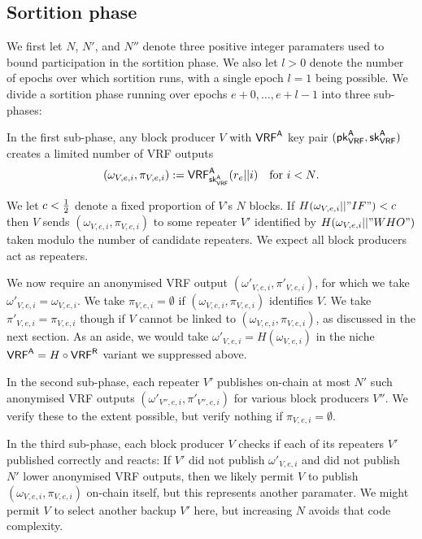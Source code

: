 \subsection{Sortition phase}\label{subsec:sortirion_phase}
\newcommand{\vrfaproductionbound}{N}
\newcommand{\vrfarepeatbound}{N'}
\newcommand{\vrfawinnerbound}{N''}

We first let $\vrfaproductionbound$, $\vrfarepeatbound$, and $\vrfawinnerbound$ denote three positive integer paramaters used to bound participation in the sortition phase.  We also let $l>0$ denote the number of epochs over which sortition runs, with a single epoch $l=1$ being possible.  We divide a sortition phase running over epochs $e+0,\ldots,e+l-1$ into three sub-phases:  

In the first sub-phase, any block producer $V$ with $\mathsf{VRF}^{\mathsf{A}}$ key pair $(\mathsf{pk}_{\mathsf{VRF}}^{\mathsf{A}},\mathsf{sk}_{\mathsf{VRF}}^{\mathsf{A}})$ creates a limited number of VRF outputs 
$$ (\omega_{V,e,i},\pi_{V,e,i}) := \VRFa_{\skvrfa}(r_e || i) \quad \textrm{for $i < \vrfaproductionbound$.} $$

We let $c < {1\over2}$ denote a fixed proportion of $V$'s $\vrfaproductionbound$ blocks.  If $H(\omega_{V,e,i} || "IF") < c$ then $V$ sends $(\omega_{V,e,i},\pi_{V,e,i})$ to some repeater $V'$ identified by $H(\omega_{V,e,i} || "WHO")$ taken modulo the number of candidate repeaters.  We expect all block producers act as repeaters.

We now require an anonymised VRF output $(\omega'_{V,e,i},\pi'_{V,e,i})$, for which we take $\omega'_{V,e,i} = \omega_{V,e,i}$.  We take $\pi_{V,e,i} = \emptyset$ if $(\omega_{V,e,i},\pi_{V,e,i})$ identifies $V$.  We take $\pi'_{V,e,i} = \pi_{V,e,i}$ though if $V$ cannot be linked to $(\omega_{V,e,i},\pi_{V,e,i})$, as discussed in the next section.  As an aside, we would take $\omega'_{V,e,i} = H(\omega_{V,e,i})$ in the niche $\mathsf{VRF}^{\mathsf{A}} = H \circ \mathsf{VRF}^{\mathsf{R}}$ variant we suppressed above.  

In the second sub-phase, each repeater $V'$ publishes on-chain at most $\vrfarepeatbound$ such anonymised VRF outputs $(\omega'_{V'',e,i},\pi'_{V'',e,i})$ for various block producers $V''$.  We verify these to the extent possible, but verify nothing if $\pi_{V,e,i} = \emptyset$.

In the third sub-phase, each block producer $V$ checks if each of its repeaters $V'$ published correctly and reacts:  If $V'$ did not publish $\omega'_{V,e,i}$ and did not publish $\vrfarepeatbound$ lower anonymised VRF outputs, then we likely permit $V$ to publish $(\omega_{V,e,i},\pi_{V,e,i})$ on-chain itself, but this represents another paramater.  We might permit $V$ to select another backup $V'$ here, but increasing $\vrfaproductionbound$ avoids that code complexity.

